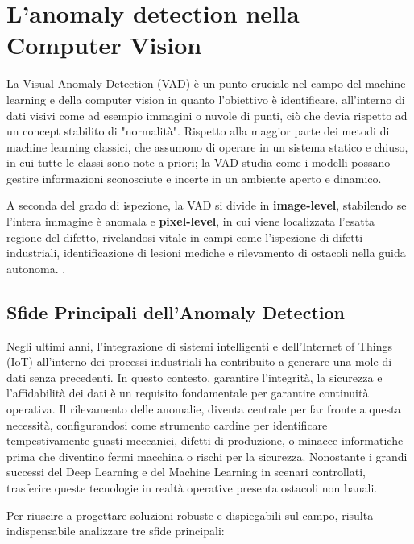 \section{L'anomaly detection nella Computer Vision}

La Visual Anomaly Detection (VAD) è un punto cruciale nel campo del machine learning e della computer vision in quanto l'obiettivo è identificare, all'interno di dati visivi come ad esempio immagini o nuvole di punti, ciò che devia rispetto ad un concept stabilito di "normalità". \cite{Cao_et_al._2024}
Rispetto alla maggior parte dei metodi di machine learning classici, che assumono di operare in un sistema statico e chiuso, in cui tutte le classi sono note a priori; la VAD studia come i modelli possano gestire informazioni sconosciute e incerte in un ambiente aperto e dinamico. \cite{Yang_et_al._2021}

A seconda del grado di ispezione, la VAD si divide in \textbf{image-level}, stabilendo se l'intera immagine è anomala e \textbf{pixel-level}, in cui viene localizzata l'esatta regione del difetto, rivelandosi vitale in campi come l'ispezione di difetti industriali, identificazione di lesioni mediche e rilevamento di ostacoli nella guida autonoma. \cite{Yang_et_al._2021}\cite{Pang_et_al._2021}.

    
\subsection{Sfide Principali dell'Anomaly Detection}

Negli ultimi anni, l'integrazione di sistemi intelligenti e dell'Internet of Things (IoT) all'interno dei processi industriali ha contribuito a generare una mole di dati senza precedenti. In questo contesto, garantire l'integrità, la sicurezza e l'affidabilità dei dati è un requisito fondamentale per garantire continuità operativa. 
Il rilevamento delle anomalie, diventa centrale per far fronte a questa necessità, configurandosi come strumento cardine per identificare tempestivamente guasti meccanici, difetti di produzione, o minacce informatiche prima che diventino fermi macchina o rischi per la sicurezza.
Nonostante i grandi successi del Deep Learning e del Machine Learning in scenari controllati, trasferire queste tecnologie in realtà operative presenta ostacoli non banali.\cite{Aggarwal_et_al._2021}\cite{Yang_et_al._2023}\cite{Ren_et_al._2021}

Per riuscire a progettare soluzioni robuste e dispiegabili sul campo, risulta indispensabile analizzare tre sfide principali:

